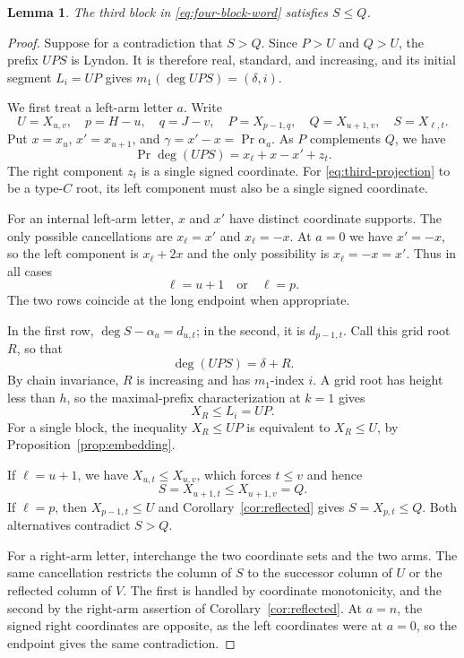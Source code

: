 \documentclass[11pt]{amsart}
\numberwithin{equation}{section}
\newtheorem{lemma}[theorem]{Lemma}
\theoremstyle{definition}
\DeclareMathOperator{\Prj}{Pr}
\begin{document}
\begin{lemma}\label{lem:third-block}
The third block in \eqref{eq:four-block-word} satisfies $S\leq Q$.
\end{lemma}
\begin{proof}
Suppose for a contradiction that $S>Q$. Since $P>U$ and $Q>U$, the prefix $UPS$ is Lyndon. It is therefore real, standard, and increasing, and its initial segment $L_i=UP$ gives $m_1(\deg UPS)=(\delta,i)$.

We first treat a left-arm letter $a$. Write
\[
 U=X_{u,v},\quad p=H-u,\quad q=J-v,
 \quad P=X_{p-1,q},\quad Q=X_{u+1,v},\quad S=X_{\ell,t}.
\]
Put $x=x_u$, $x'=x_{u+1}$, and $\gamma=x'-x=\Prj\alpha_a$. As $P$ complements $Q$, we have
\begin{equation}\label{eq:third-projection}
 \Prj\deg(UPS)=x_\ell+x-x'+z_t.
\end{equation}
The right component $z_t$ is a single signed coordinate. For \eqref{eq:third-projection} to be a type-$C$ root, its left component must also be a single signed coordinate.

For an internal left-arm letter, $x$ and $x'$ have distinct coordinate supports. The only possible cancellations are $x_\ell=x'$ and $x_\ell=-x$. At $a=0$ we have $x'=-x$, so the left component is $x_\ell+2x$ and the only possibility is $x_\ell=-x=x'$. Thus in all cases
\begin{equation}\label{eq:third-rows}
 \ell=u+1\quad\text{or}\quad\ell=p.
\end{equation}
The two rows coincide at the long endpoint when appropriate.

In the first row, $\deg S-\alpha_a=d_{u,t}$; in the second, it is $d_{p-1,t}$. Call this grid root $R$, so that
\[
 \deg(UPS)=\delta+R.
\]
By chain invariance, $R$ is increasing and has $m_1$-index $i$. A grid root has height less than $h$, so the maximal-prefix characterization at $k=1$ gives
\begin{equation}\label{eq:third-short-bound}
 X_R\leq L_i=UP.
\end{equation}
For a single block, the inequality $X_R\leq UP$ is equivalent to $X_R\leq U$, by Proposition~\ref{prop:embedding}.

If $\ell=u+1$, we have $X_{u,t}\leq X_{u,v}$, which forces $t\leq v$ and hence
\[
 S=X_{u+1,t}\leq X_{u+1,v}=Q.
\]
If $\ell=p$, then $X_{p-1,t}\leq U$ and Corollary~\ref{cor:reflected} gives $S=X_{p,t}\leq Q$. Both alternatives contradict $S>Q$.

For a right-arm letter, interchange the two coordinate sets and the two arms. The same cancellation restricts the column of $S$ to the successor column of $U$ or the reflected column of $V$. The first is handled by coordinate monotonicity, and the second by the right-arm assertion of Corollary~\ref{cor:reflected}. At $a=n$, the signed right coordinates are opposite, as the left coordinates were at $a=0$, so the endpoint gives the same contradiction.
\end{proof}
\end{document}
